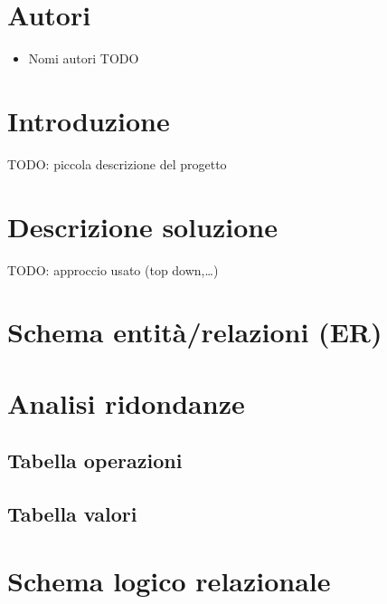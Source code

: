\documentclass[
]{article}
\author{}
\date{}
\providecommand{\tightlist}{%
  \setlength{\itemsep}{0pt}\setlength{\parskip}{0pt}}
\begin{document}
\hypertarget{autori}{%
\section{Autori}\label{autori}}

\begin{itemize}
\tightlist
\item
  Nomi autori TODO
\end{itemize}

\hypertarget{introduzione}{%
\section{Introduzione}\label{introduzione}}

TODO: piccola descrizione del progetto

\hypertarget{descrizione-soluzione}{%
\section{Descrizione soluzione}\label{descrizione-soluzione}}

TODO: approccio usato (top down,\ldots)

\hypertarget{schema-entituxe0relazioni-er}{%
\section{Schema entità/relazioni
(ER)}\label{schema-entituxe0relazioni-er}}

\hypertarget{analisi-ridondanze}{%
\section{Analisi ridondanze}\label{analisi-ridondanze}}

\hypertarget{tabella-operazioni}{%
\subsection{Tabella operazioni}\label{tabella-operazioni}}

\hypertarget{tabella-valori}{%
\subsection{Tabella valori}\label{tabella-valori}}

\hypertarget{schema-logico-relazionale}{%
\section{Schema logico relazionale}\label{schema-logico-relazionale}}
\end{document}
